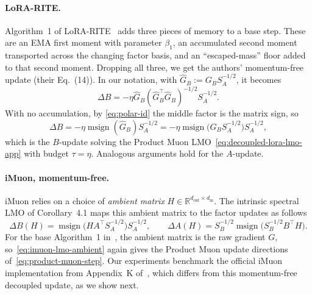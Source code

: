 \documentclass[11pt]{article}
\newcommand{\R}{\mathbb{R}}
\DeclareMathOperator{\msign}{msign}          %
\theoremstyle{plain}
\theoremstyle{definition}
\theoremstyle{remark}
\theoremstyle{definition}
\begin{document}
\paragraph{LoRA-RITE.}
Algorithm~1 of LoRA-RITE~\cite{lorarite} adds three pieces of memory to a base step. These are an EMA first moment with parameter $\beta_1$, an accumulated second moment transported across the changing factor basis, and an ``escaped-mass'' floor added to that second moment.
Dropping all three, we get the authors' momentum-free update (their Eq.~(14)).
In our notation, with $\widehat G_B := G_B S_A^{-1/2}$, it becomes
\[
  \Delta B=-\eta \widehat G_B (\widehat G_B^\top\widehat G_B)^{-1/2} S_A^{-1/2}.
\]
With no accumulation, by \eqref{eq:polar-id} the middle factor is the matrix sign, so
\begin{equation*}
  \Delta B=-\eta \msign(\widehat G_B) S_A^{-1/2}
  =-\eta \msign \big(G_B S_A^{-1/2}\big) S_A^{-1/2},
\end{equation*}
which is the $B$-update solving the Product Muon LMO~\eqref{eq:decoupled-lora-lmo-app} with budget $\tau=\eta$. Analogous arguments hold for the $A$-update.


\paragraph{iMuon, momentum-free.}
iMuon relies on a choice of \emph{ambient matrix} $H\in\R^{d_{\mathrm{out}}\times d_{\mathrm{in}}}$. The intrinsic spectral LMO of Corollary~4.1 maps this ambient matrix to the factor updates as follows
\begin{equation}
  \Delta B(H) =\msign \big(HA^\top S_A^{-1/2}\big)S_A^{-1/2},\qquad
  \Delta A(H) =S_B^{-1/2}\msign \big(S_B^{-1/2}B^\top H\big).
  \label{eq:imuon-lmo-ambient}
\end{equation}
For the base Algorithm~1 in~\cite{imuon}, the ambient matrix is the raw gradient $G$, so~\eqref{eq:imuon-lmo-ambient}
again gives the Product Muon update directions of~\eqref{eq:product-muon-step}. Our experiments benchmark the official iMuon implementation from Appendix~K of~\cite{imuon}, which differs from this momentum-free decoupled update, as we show next.
\end{document}
